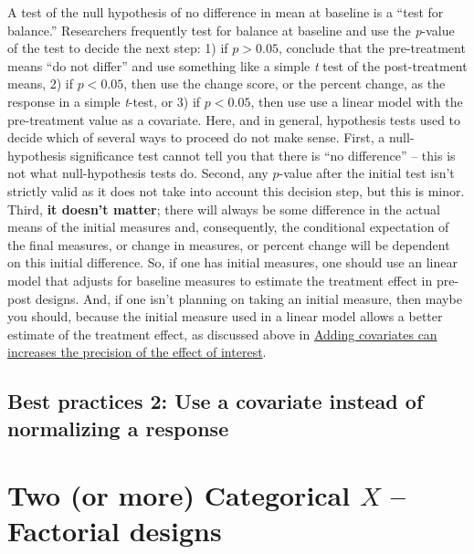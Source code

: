 \documentclass[]{book}
\begin{document}
A test of the null hypothesis of no difference in mean at baseline is a ``test for balance.'' Researchers frequently test for balance at baseline and use the \emph{p}-value of the test to decide the next step: 1) if \(p > 0.05\), conclude that the pre-treatment means ``do not differ'' and use something like a simple \emph{t} test of the post-treatment means, 2) if \(p < 0.05\), then use the change score, or the percent change, as the response in a simple \emph{t}-test, or 3) if \(p < 0.05\), then use use a linear model with the pre-treatment value as a covariate. Here, and in general, hypothesis tests used to decide which of several ways to proceed do not make sense. First, a null-hypothesis significance test cannot tell you that there is ``no difference'' -- this is not what null-hypothesis tests do. Second, any \(p\)-value after the initial test isn't strictly valid as it does not take into account this decision step, but this is minor. Third, \textbf{it doesn't matter}; there will always be some difference in the actual means of the initial measures and, consequently, the conditional expectation of the final measures, or change in measures, or percent change will be dependent on this initial difference. So, if one has initial measures, one should use an linear model that adjusts for baseline measures to estimate the treatment effect in pre-post designs. And, if one isn't planning on taking an initial measure, then maybe you should, because the initial measure used in a linear model allows a better estimate of the treatment effect, as discussed above in \protect\hyperlink{adding-covariates-can-increases-the-precision-of-the-effect-of-interest}{Adding covariates can increases the precision of the effect of interest}.

\hypertarget{best-practices-2-use-a-covariate-instead-of-normalizing-a-response}{%
\section{Best practices 2: Use a covariate instead of normalizing a response}\label{best-practices-2-use-a-covariate-instead-of-normalizing-a-response}}

\hypertarget{two-or-more-categorical-x-factorial-designs}{%
\chapter{\texorpdfstring{Two (or more) Categorical \(X\) -- Factorial designs}{Two (or more) Categorical X -- Factorial designs}}\label{two-or-more-categorical-x-factorial-designs}}
\end{document}

